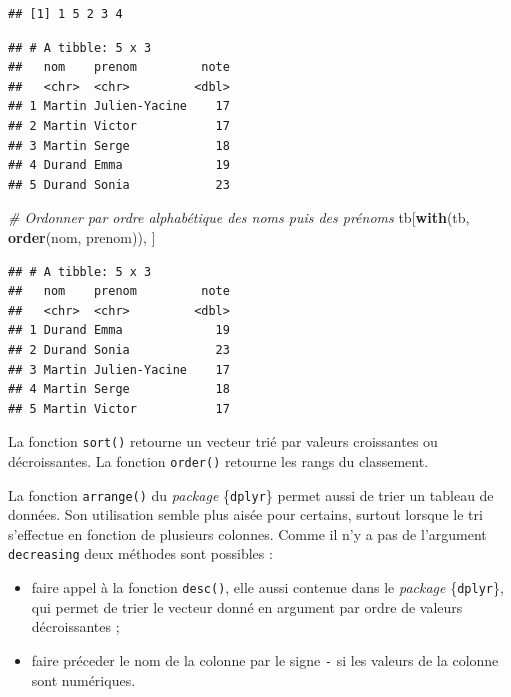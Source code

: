 \documentclass[
  11pt,
]{book}
\newenvironment{Shaded}{\begin{snugshade}}{\end{snugshade}}
\newcommand{\CommentTok}[1]{\textcolor[rgb]{0.56,0.35,0.01}{\textit{#1}}}
\newcommand{\KeywordTok}[1]{\textcolor[rgb]{0.13,0.29,0.53}{\textbf{#1}}}
\newcommand{\NormalTok}[1]{#1}
\newcommand{\OperatorTok}[1]{\textcolor[rgb]{0.81,0.36,0.00}{\textbf{#1}}}
\providecommand{\tightlist}{%
  \setlength{\itemsep}{0pt}\setlength{\parskip}{0pt}}
\numberwithin{equation}{section}
\newcounter{countremarque}
\newenvironment{remarque}{%
 \refstepcounter{countremarque}
    \begin{tcolorbox}[width=\linewidth, colback=blue!3, boxrule=0.5pt,arc=0pt,title = Remarque \thecountremarque]
    }%
    {
    \end{tcolorbox}
    }
\numberwithin{countremarque}{section}
\begin{document}
\begin{lstlisting}
## [1] 1 5 2 3 4
\end{lstlisting}

\begin{Shaded}
\end{Shaded}

\begin{lstlisting}
## # A tibble: 5 x 3
##   nom    prenom         note
##   <chr>  <chr>         <dbl>
## 1 Martin Julien-Yacine    17
## 2 Martin Victor           17
## 3 Martin Serge            18
## 4 Durand Emma             19
## 5 Durand Sonia            23
\end{lstlisting}

\begin{Shaded}
\begin{Highlighting}[]
\CommentTok{\# Ordonner par ordre alphabétique des noms puis des prénoms}
\NormalTok{tb[}\KeywordTok{with}\NormalTok{(tb, }\KeywordTok{order}\NormalTok{(nom, prenom)), ]}
\end{Highlighting}
\end{Shaded}

\begin{lstlisting}
## # A tibble: 5 x 3
##   nom    prenom         note
##   <chr>  <chr>         <dbl>
## 1 Durand Emma             19
## 2 Durand Sonia            23
## 3 Martin Julien-Yacine    17
## 4 Martin Serge            18
## 5 Martin Victor           17
\end{lstlisting}

\begin{remarque}
La fonction \texttt{sort()} retourne un vecteur trié par valeurs croissantes ou décroissantes. La fonction \texttt{order()} retourne les rangs du classement.
\end{remarque}

La fonction \texttt{arrange()} du \emph{package} \{\texttt{dplyr}\} permet aussi de trier un tableau de données. Son utilisation semble plus aisée pour certains, surtout lorsque le tri s'effectue en fonction de plusieurs colonnes. Comme il n'y a pas de l'argument \texttt{decreasing} deux méthodes sont possibles :

\begin{itemize}
\tightlist
\item
  faire appel à la fonction \texttt{desc()}, elle aussi contenue dans le \emph{package} \{\texttt{dplyr}\}, qui permet de trier le vecteur donné en argument par ordre de valeurs décroissantes ;
\item
  faire préceder le nom de la colonne par le signe \texttt{-} si les valeurs de la colonne sont numériques.
\end{itemize}
\end{document}
